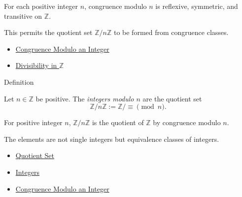 \begin{remark*}
For each positive integer \(n\), congruence modulo \(n\) is reflexive,
symmetric, and transitive on \(\mathbb{Z}\).
\end{remark*}

\begin{remark*}[Interpretation]
This permits the quotient set \(\mathbb{Z}/n\mathbb{Z}\) to be formed from
congruence classes.
\end{remark*}

\begin{dependencies}
\begin{itemize}
\item \hyperref[def:congruence-modulo-integer]{Congruence Modulo an Integer}
  \item \hyperref[def:divisibility-in-z]{Divisibility in \(\mathbb{Z}\)}
\end{itemize}
\end{dependencies}

\begin{definitionbox}{Definition}
\begin{definition}
\label{def:integers-modulo-n}
Let \(n\in\mathbb{Z}\) be positive. The \emph{integers modulo \(n\)} are the
quotient set
\[
\mathbb{Z}/n\mathbb{Z}:=\mathbb{Z}/{\equiv \pmod n}.
\]
\end{definition}
\end{definitionbox}

\begin{remark*}
For positive integer \(n\), \(\mathbb{Z}/n\mathbb{Z}\) is the quotient of
\(\mathbb{Z}\) by congruence modulo \(n\).
\end{remark*}

\begin{remark*}[Interpretation]
The elements are not single integers but equivalence classes of integers.
\end{remark*}

\begin{dependencies}
\begin{itemize}
  \item \hyperref[def:quotient-set]{Quotient Set}
  \item \hyperref[def:integers]{Integers}
  \item \hyperref[def:congruence-modulo-integer]{Congruence Modulo an Integer}
\end{itemize}
\end{dependencies}

